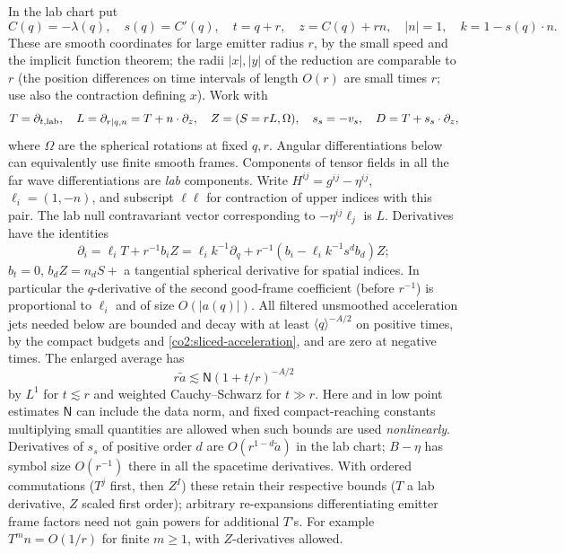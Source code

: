 In the lab chart put
\begin{equation*}
C(q)=-\lambda(q),\quad s(q)=C'(q),\quad t=q+r,\quad z=C(q)+rn,\quad |n|=1,\quad k=1-s(q)\cdot n .
\end{equation*}
These are smooth coordinates for large emitter radius \(r\), by the small speed and the implicit function theorem; the radii \(|x|,|y|\) of the reduction are comparable to \(r\) (the position differences on time intervals of length \(O(r)\) are small times \(r\); use also the contraction defining \(x\)). Work with
\begin{equation*}
T=\partial_{t,{\rm lab}},\quad L=\partial_{r|q,n}=T+n\cdot\partial_z,\quad
 Z=(S=rL,\Omega),\quad s_s=-v_s,\quad D=T+s_s\cdot\partial_z ,
\end{equation*}
where \(\Omega\) are the spherical rotations at fixed \(q,r\). Angular differentiations below can equivalently use finite smooth frames. Components of tensor fields in all the far wave differentiations are \emph{lab} components. Write \(H^{ij}=g^{ij}-\eta^{ij}\), \(\ell_i=(1,-n)\), and subscript \(\ell\ell\) for contraction of upper indices with this pair. The lab null contravariant vector corresponding to \(-\eta^{ij}\ell_j\) is \(L\). Derivatives have the identities
\begin{equation*}
\partial_i=\ell_i T+r^{-1}b_i Z
     =\ell_i k^{-1}\partial_q+r^{-1}(b_i-\ell_i k^{-1}s^d b_d)Z ;
\end{equation*}
\(b_t=0\), \(b_dZ=n_d S+\) a tangential spherical derivative for spatial indices. In particular the \(q\)-derivative of the second good-frame coefficient (before \(r^{-1}\)) is proportional to \(\ell_i\) and of size \(O(|a(q)|)\). All filtered unsmoothed acceleration jets needed below are bounded and decay with at least \(\langle q\rangle^{-A/2}\) on positive times, by the compact budgets and \eqref{co2:sliced-acceleration}, and are zero at negative times. The enlarged average has
\begin{equation*}
r\widetilde a\lesssim \mathsf N(1+t/r)^{-A/2}
\end{equation*}
by \(L^1\) for \(t\lesssim r\) and weighted Cauchy--Schwarz for \(t\gg r\). Here and in low point estimates \(\mathsf N\) can include the data norm, and fixed compact-reaching constants multiplying small quantities are allowed when such bounds are used \emph{nonlinearly}. Derivatives of \(s_s\) of positive order \(d\) are \(O(r^{1-d}\widetilde a)\) in the lab chart; \(B-\eta\) has symbol size \(O(r^{-1})\) there in all the spacetime derivatives. With ordered commutations (\(T^j\) first, then \(Z^I\)) these retain their respective bounds (\(T\) a lab derivative, \(Z\) scaled first order); arbitrary re-expansions differentiating emitter frame factors need not gain powers for additional \(T\)'s. For example \(T^m n=O(1/r)\) for finite \(m\ge1\), with \(Z\)-derivatives allowed.

